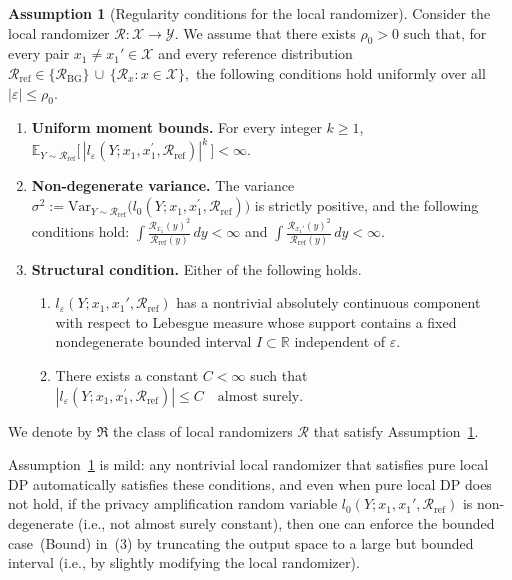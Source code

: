 \documentclass{article}
\theoremstyle{plain}
\theoremstyle{definition}
\newtheorem{assumption}[theorem]{Assumption}
\begin{document}
\begin{assumption}[Regularity conditions for the local randomizer]
\label{assump:regularity}
Consider the local randomizer $\mathcal R:\mathcal X\to\mathcal Y$.
We assume that there exists $\rho_0>0$ such that, for every pair
$x_1\neq x_1'\in\mathcal X$ and every reference distribution
$
  \mathcal R_{\mathrm{ref}}\in
  \bigl\{\mathcal R_{\mathrm{BG}}\bigr\}
  \,\cup\,
  \bigl\{\mathcal R_x : x\in\mathcal X\bigr\},
$
the following conditions hold uniformly over all $|\varepsilon|\le\rho_0$.


\begin{enumerate}
  \item[\textup{(1)}]
  \textbf{Uniform moment bounds.}
  For every integer $k\ge 1$,
  $
    \mathbb E_{Y\sim \mathcal{R}_{\mathrm{ref}}}
    \bigl[\,|l_{\varepsilon}(Y;x_1,x_1^\prime,\mathcal R_{\mathrm{ref}})|^k\,\bigr]
    <\infty.
  $

\item[\textup{(2)}]
\textbf{Non-degenerate variance.}
The variance
$
  \sigma^2 := \mathrm{Var}_{Y\sim \mathcal{R}_{\mathrm{ref}}}\bigl(l_{0}(Y;x_1,x_1^\prime,\mathcal R_{\mathrm{ref}})\bigr)
$
is strictly positive, and the following conditions hold:
$
  \int \frac{\mathcal R_{x_1}(y)^2}{\mathcal R_{\mathrm{ref}}(y)}\,dy < \infty
$ and
$
  \int \frac{\mathcal R_{x_1'}(y)^2}{\mathcal R_{\mathrm{ref}}(y)}\,dy < \infty.
$
  \item[\textup{(3)}]
  \textbf{Structural condition.}
  Either of the following holds.
  \begin{enumerate}
\item[\textup{(Cont)}]

$l_{\varepsilon}(Y;x_1,x_1',\mathcal{R}_{\mathrm{ref}})$ has a nontrivial absolutely continuous component with respect to Lebesgue
measure whose support contains a fixed nondegenerate bounded interval
$I\subset\mathbb{R}$ independent of
$\varepsilon$.
    \item[\textup{(Bound)}]
    There exists a constant $C<\infty$ such that
    $
      |l_{\varepsilon}(Y;x_1,x_1^\prime,\mathcal R_{\mathrm{ref}})|
      \le C
      \quad\text{almost surely}.
    $
  \end{enumerate}
\end{enumerate}

We denote by $\mathfrak{R}$ the class of local randomizers $\mathcal R$ that satisfy Assumption~\ref{assump:regularity}.
\end{assumption}

Assumption~\ref{assump:regularity} is mild: any nontrivial local randomizer that satisfies pure local DP automatically satisfies these conditions, and even when pure local DP does not hold, if the privacy amplification random variable $l_0(Y;x_1,x_1',\mathcal R_{\mathrm{ref}})$ is non-degenerate (i.e., not almost surely constant), then one can enforce the bounded case~\textup{(Bound)} in~(3) by truncating the output space to a large but bounded interval (i.e., by slightly modifying the local randomizer). 
\end{document}

